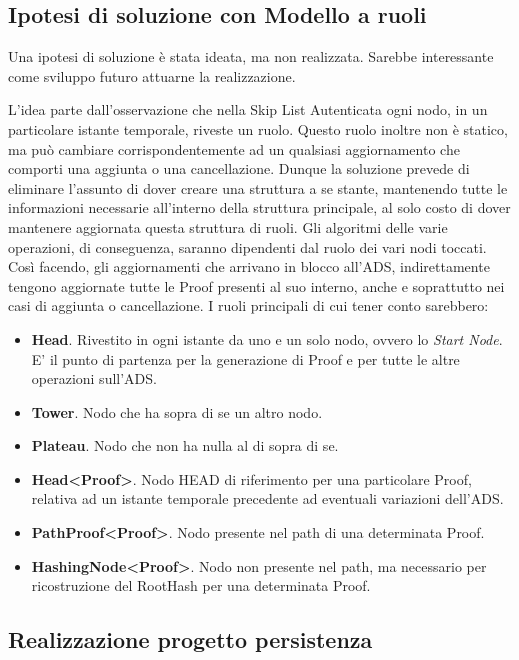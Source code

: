 	\subsection{Ipotesi di soluzione con Modello a ruoli}
	
	
		Una ipotesi di soluzione è stata ideata, ma non realizzata. Sarebbe interessante come sviluppo futuro attuarne la realizzazione.
		
		L'idea parte dall'osservazione che nella Skip List Autenticata ogni nodo, in un particolare istante temporale, riveste un ruolo. Questo ruolo inoltre non è statico, ma può cambiare corrispondentemente ad un qualsiasi aggiornamento che comporti una aggiunta o una cancellazione. Dunque la soluzione prevede di eliminare l'assunto di dover creare una struttura a se stante, mantenendo tutte le informazioni necessarie all'interno della struttura principale, al solo costo di dover mantenere aggiornata questa struttura di ruoli. Gli algoritmi delle varie operazioni, di conseguenza, saranno dipendenti dal ruolo dei vari nodi toccati. Così facendo, gli aggiornamenti che arrivano in blocco all'ADS, indirettamente tengono aggiornate tutte le Proof presenti al suo interno, anche e soprattutto nei casi di aggiunta o cancellazione.
		I ruoli principali di cui tener conto sarebbero:
		\begin{itemize}
			\item \textbf{Head}. Rivestito in ogni istante da uno e un solo nodo, ovvero lo \textit{Start Node}. E' il punto di partenza per la generazione di Proof e per tutte le altre operazioni sull'ADS.
			\item \textbf{Tower}. Nodo che ha sopra di se un altro nodo.
			\item \textbf{Plateau}. Nodo che non ha nulla al di sopra di se.
			\item \textbf{Head<Proof>}. Nodo HEAD di riferimento per una particolare Proof, relativa ad un istante temporale precedente ad eventuali variazioni dell'ADS.
			\item \textbf{PathProof<Proof>}. Nodo presente nel path di una determinata Proof.
			\item \textbf{HashingNode<Proof>}. Nodo non presente nel path, ma necessario per ricostruzione del RootHash per una determinata Proof.
		\end{itemize}
		
	\subsection{Realizzazione progetto persistenza}
		
